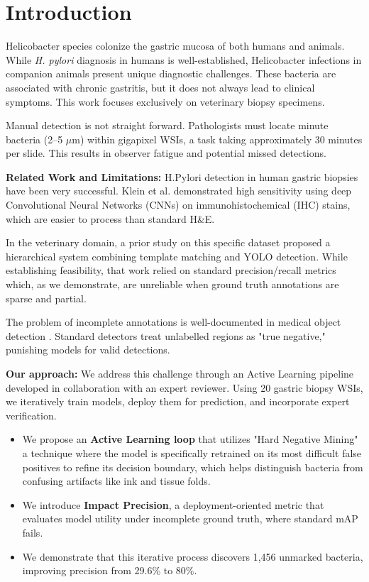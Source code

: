 \documentclass[sigconf, review, nonacm]{acmart}
\begin{document}
\section{Introduction}
Helicobacter species colonize the gastric mucosa of both humans and animals. While \textit{H. pylori} diagnosis in humans is well-established, Helicobacter infections in companion animals present unique diagnostic challenges. These bacteria are associated with chronic gastritis, but it does not always lead to clinical symptoms. This work focuses exclusively on veterinary biopsy specimens.

Manual detection is not straight forward. Pathologists must locate minute bacteria (2--5 $\mu$m) within gigapixel WSIs, a task taking approximately 30 minutes per slide. This results in observer fatigue and potential missed detections.

\noindent \textbf{Related Work and Limitations:} 
H.Pylori detection in human gastric biopsies have been very successful. Klein et al. \cite{klein2020deep} demonstrated high sensitivity using deep Convolutional Neural Networks (CNNs) on immunohistochemical (IHC) stains, which are easier to process than standard H\&E.

In the veterinary domain, a prior study on this specific dataset \cite{senior2025cad} proposed a hierarchical system combining template matching and YOLO detection. While establishing feasibility, that work relied on standard precision/recall metrics which, as we demonstrate, are unreliable when ground truth annotations are sparse and partial.

The problem of incomplete annotations is well-documented in medical object detection \cite{bilen2016weakly}. Standard detectors treat unlabelled regions as "true negative," punishing models for valid detections.

\noindent \textbf{Our approach:}
We address this challenge through an Active Learning pipeline developed in collaboration with an expert reviewer. Using 20 gastric biopsy WSIs, we iteratively train models, deploy them for prediction, and incorporate expert verification.
\begin{itemize}[leftmargin=*]
    \item We propose an \textbf{Active Learning loop} that utilizes "Hard Negative Mining" a technique where the model is specifically retrained on its most difficult false positives to refine its decision boundary, \cite{shrivastava2016training} which helps distinguish bacteria from confusing artifacts like ink and tissue folds.
    \item We introduce \textbf{Impact Precision}, a deployment-oriented metric that evaluates model utility under incomplete ground truth, where standard mAP fails.
    \item We demonstrate that this iterative process discovers 1,456 unmarked bacteria, improving precision from 29.6\% to 80\%.
\end{itemize}
\end{document}
